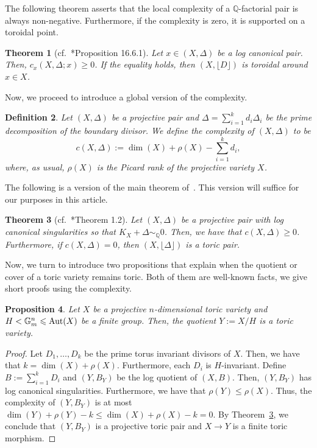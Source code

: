\documentclass{amsart}
\renewcommand{\qq}{\mathbb{Q}}
\newtheorem{theorem}{Theorem}[section]
\newtheorem{proposition}[theorem]{Proposition}
\newtheorem{definition}[theorem]{Definition}
\theoremstyle{remark}
\numberwithin{equation}{section}
\begin{document}
The following theorem asserts that the local complexity of a $\qq$-factorial pair is always non-negative.
Furthermore, if the complexity is zero, it is supported on a toroidal point.

\begin{theorem}[cf.~\cite{Kol92}*{Proposition 16.6.1}]\label{thm:toroidality}
Let $x\in (X,\Delta)$ be a log canonical pair.
Then, $c_x(X,\Delta;x)\geq 0$.
If the equality holds, then $(X,\lfloor D\rfloor)$ is toroidal around $x\in X$.
\end{theorem}

Now, we proceed to introduce a global version of the complexity.

\begin{definition}{\em
Let $(X,\Delta)$ be a projective pair
and $\Delta=\sum_{i=1}^k d_i\Delta_i$ be the prime decomposition of the boundary divisor.
We define the {\em complexity} of $(X,\Delta)$ to be
\[
c(X,\Delta):= \dim(X)+\rho(X)-\sum_{i=1}^k d_i,
\]
where, as usual, $\rho(X)$ is the Picard rank of the projective variety $X$.}
\end{definition}

The following is a version of the main theorem of~\cite{BMSZ18}.
This version will suffice for our purposes in this article.

\begin{theorem}[cf.~\cite{BMSZ18}*{Theorem 1.2}]\label{thm:toric-by-complexity}
Let $(X,\Delta)$ be a projective pair with log canonical singularities so that $K_X+\Delta\sim_\qq 0$.
Then, we have that $c(X,\Delta)\geq 0$.
Furthermore, if $c(X,\Delta)=0$, then
$(X,\lfloor\Delta\rfloor)$ is a toric pair.
\end{theorem} 

Now, we turn to introduce two propositions that explain when the quotient or cover of a toric variety remains toric.
Both of them are well-known facts, we give short proofs using the complexity.

\begin{proposition}\label{prop:quot-toric-by-toric-finite}
Let $X$ be a projective $n$-dimensional toric variety and
$H<\mathbb{G}_m^n\leqslant {\rm Aut}(X)$ 
be a finite group.
Then, the quotient $Y:=X/H$ is a toric variety.
\end{proposition}

\begin{proof}
Let $D_1,\dots,D_k$ be the prime torus invariant divisors of $X$.
Then, we have that $k=\dim(X)+\rho(X)$.
Furthermore, each $D_i$ is $H$-invariant.
Define $B:=\sum_{i=1}^k D_i$ 
and $(Y,B_Y)$ be the log quotient of $(X,B)$.
Then, $(Y,B_Y)$ has log canonical singularities.
Furthermore, we have that
$\rho(Y)\leq \rho(X)$.
Thus, the complexity of $(Y,B_Y)$
is at most $\dim(Y)+\rho(Y)-k \leq \dim(X)+\rho(X)-k=0$.
By Theorem~\ref{thm:toric-by-complexity}, we conclude that $(Y,B_Y)$ is a projective toric pair and $X\rightarrow Y$ is a finite toric morphism.
\end{proof}
\end{document}
